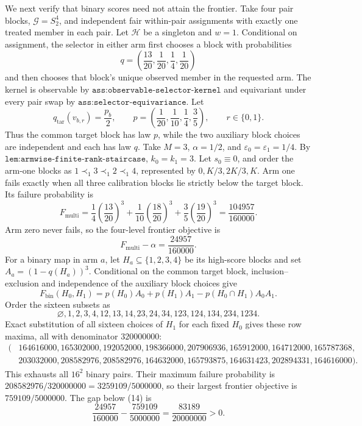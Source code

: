 We next verify that binary scores need not attain the frontier. Take four pair blocks, \(\mathcal G=S_2^4\), and independent fair within-pair assignments with exactly one treated member in each pair. Let \(\mathcal H\) be a singleton and \(w=1\). Conditional on assignment, the selector in either arm first chooses a block with probabilities
\[
q=\left(\frac{13}{20},\frac1{20},\frac14,\frac1{20}\right)
\tag{11}
\]
and then chooses that block's unique observed member in the requested arm. The kernel is observable by \(\texttt{ass:observable-selector-kernel}\) and equivariant under every pair swap by \(\texttt{ass:selector-equivariance}\). Let
\[
q_{\mathrm{tar}}(v_{b,r})=\frac{p_b}{2},\qquad
p=\left(\frac1{20},\frac1{10},\frac14,\frac35\right),\qquad r\in\{0,1\}.
\tag{12}
\]
Thus the common target block has law \(p\), while the two auxiliary block choices are independent and each has law \(q\). Take \(M=3\), \(\alpha=1/2\), and \(\varepsilon_0=\varepsilon_1=1/4\). By \(\texttt{lem:armwise-finite-rank-staircase}\), \(k_0=k_1=3\). Let \(s_0\equiv0\), and order the arm-one blocks as \(1\prec_1 3\prec_1 2\prec_1 4\), represented by \(0,K/3,2K/3,K\). Arm one fails exactly when all three calibration blocks lie strictly below the target block. Its failure probability is
\[
F_{\mathrm{multi}}=\frac14\left(\frac{13}{20}\right)^3
+\frac1{10}\left(\frac{18}{20}\right)^3
+\frac35\left(\frac{19}{20}\right)^3
=\frac{104957}{160000}.
\tag{13}
\]
Arm zero never fails, so the four-level frontier objective is
\[
F_{\mathrm{multi}}-\alpha=\frac{24957}{160000}.
\tag{14}
\]
For a binary map in arm \(a\), let \(H_a\subseteq\{1,2,3,4\}\) be its high-score blocks and set \(A_a=(1-q(H_a))^3\). Conditional on the common target block, inclusion--exclusion and independence of the auxiliary block choices give
\[
F_{\mathrm{bin}}(H_0,H_1)=p(H_0)A_0+p(H_1)A_1-p(H_0\cap H_1)A_0A_1.
\tag{15}
\]
Order the sixteen subsets as
\[
\varnothing,1,2,3,4,12,13,14,23,24,34,123,124,134,234,1234.
\]
Exact substitution of all sixteen choices of \(H_1\) for each fixed \(H_0\) gives these row maxima, all with denominator \(320000000\):
\[
\begin{split}
(&164616000,165302000,192052000,198366000,207906936,165912000,164712000,165787368,\\
&203032000,208582976,208582976,164632000,165793875,164631423,202894331,164616000).
\end{split}
\tag{16}
\]
This exhausts all \(16^2\) binary pairs. Their maximum failure probability is \(208582976/320000000=3259109/5000000\), so their largest frontier objective is \(759109/5000000\). The gap below (14) is
\[
\frac{24957}{160000}-\frac{759109}{5000000}
=\frac{83189}{20000000}>0.
\tag{17}
\]

